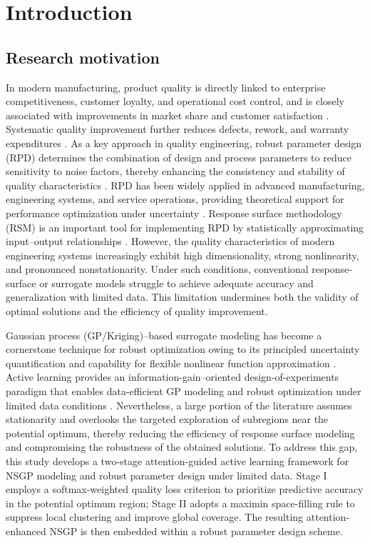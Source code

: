 \documentclass[]{interact}
\theoremstyle{plain}%
\theoremstyle{definition}
\theoremstyle{remark}
\begin{document}
\section{Introduction}
\subsection{Research motivation}
In modern manufacturing, product quality is directly linked to enterprise competitiveness, customer loyalty, and operational cost control, and is closely associated with improvements in market share and customer satisfaction \citep{Wu2011, He2021, Liw2025}. Systematic quality improvement further reduces defects, rework, and warranty expenditures \citep{Wu2020}. As a key approach in quality engineering, robust parameter design (RPD) determines the combination of design and process parameters to reduce sensitivity to noise factors, thereby enhancing the consistency and stability of quality characteristics \citep{Bao2016, Ouyang2016, Ouyang2025}. RPD has been widely applied in advanced manufacturing, engineering systems, and service operations, providing theoretical support for performance optimization under uncertainty \citep{Chuang2017, An2020, Huang2022}. Response surface methodology (RSM) is an important tool for implementing RPD by statistically approximating input–output relationships \citep{Fan2000, Ding2004, Peterson2009, Li2025}. However, the quality characteristics of modern engineering systems increasingly exhibit high dimensionality, strong nonlinearity, and pronounced nonstationarity. Under such conditions, conventional response-surface or surrogate models struggle to achieve adequate accuracy and generalization with limited data. This limitation undermines both the validity of optimal solutions and the efficiency of quality improvement.

Gaussian process (GP/Kriging)–based surrogate modeling has become a cornerstone technique for robust optimization owing to its principled uncertainty quantification and capability for flexible nonlinear function approximation \citep{Williams2006, Ankenman2010, Santner2018, Liu2025}. Active learning provides an information-gain–oriented design-of-experiments paradigm that enables data-efficient GP modeling and robust optimization under limited data conditions \citep{Wang2025, Feng2025}. Nevertheless, a large portion of the literature assumes stationarity and overlooks the targeted exploration of subregions near the potential optimum, thereby reducing the efficiency of response surface modeling and compromising the robustness of the obtained solutions. To address this gap, this study develops a two-stage attention-guided active learning framework for NSGP modeling and robust parameter design under limited data. Stage I employs a softmax-weighted quality loss criterion to prioritize predictive accuracy in the potential optimum region; Stage II adopts a maximin space-filling rule to suppress local clustering and improve global coverage. The resulting attention-enhanced NSGP is then embedded within a robust parameter design scheme.
\end{document}
